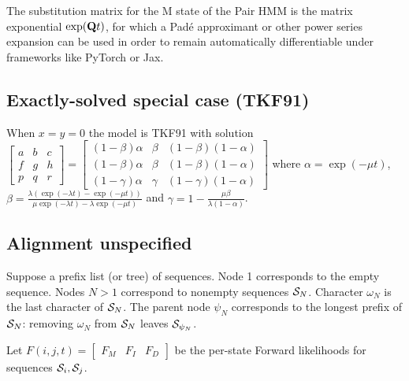 \documentclass{article}
\begin{document}

The substitution matrix for the M state of the Pair HMM is
the matrix exponential $\exp({\bf Q}t)$, for which a Pad\'{e} approximant
or other power series expansion can be used in order to remain automatically differentiable under frameworks like PyTorch or Jax. %

\subsection{Exactly-solved special case (TKF91)}

When $x=y=0$ the model is TKF91 \cite{ThorneEtAl91}
with solution
$
\begin{bmatrix}
a & b & c \\
f & g & h \\
p & q & r 
\end{bmatrix}
=
\begin{bmatrix}
(1-\beta)\alpha & \beta & (1-\beta)(1-\alpha) \\
(1-\beta)\alpha & \beta & (1-\beta)(1-\alpha) \\
(1-\gamma)\alpha & \gamma & (1-\gamma)(1-\alpha)
\end{bmatrix}
$
where
$\alpha = \exp(-\mu t)$,
$\beta = \frac{\lambda \left( \exp(-\lambda t) - \exp(-\mu t) \right)}{\mu \exp(-\lambda t) - \lambda \exp(-\mu t)}$
and
$\gamma = 1 - \frac{\mu \beta}{\lambda (1 - \alpha)}$.



\subsection{Alignment unspecified}

Suppose a prefix list (or tree) of sequences.
Node 1 corresponds to the empty sequence.
Nodes $N>1$ correspond to nonempty sequences ${\cal S}_N$.
Character $\omega_N$ is the last character of ${\cal S}_N$.
The parent node $\psi_N$ corresponds to the longest prefix of ${\cal S}_N$:
removing $\omega_N$ from ${\cal S}_N$ leaves ${\cal S}_{\psi_N}$.

Let $F(i,j,t) = \begin{bmatrix} F_M & F_I & F_D \end{bmatrix}$
be the per-state Forward likelihoods for sequences ${\cal S}_i,{\cal S}_j$.
\end{document}
